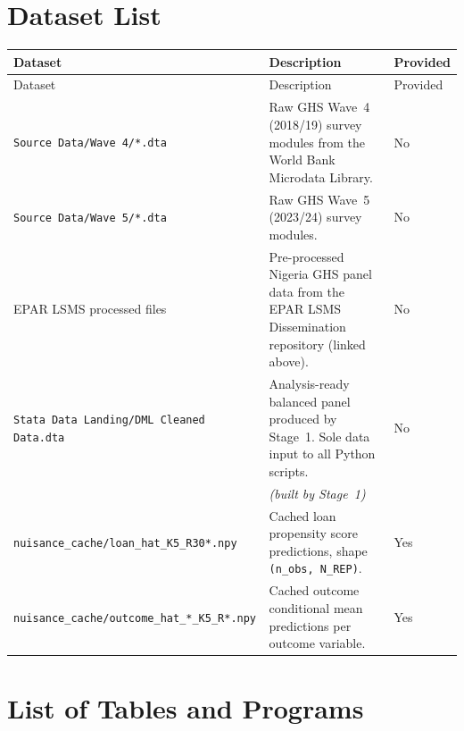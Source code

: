 \documentclass[11pt]{article}
\begin{document}
\section{Dataset List}

\begin{longtable}{@{}p{}p{}p{}@{}}
\toprule
Dataset & Description & Provided \\
\midrule
\endfirsthead
\toprule
Dataset & Description & Provided \\
\midrule
\endhead
\bottomrule
\endfoot
\texttt{Source Data/Wave 4/*.dta} &
    Raw GHS Wave~4 (2018/19) survey modules from the World Bank
    Microdata Library. &
    No \\[3pt]
\texttt{Source Data/Wave 5/*.dta} &
    Raw GHS Wave~5 (2023/24) survey modules. &
    No \\[3pt]
EPAR LSMS processed files &
    Pre-processed Nigeria GHS panel data from the EPAR LSMS
    Dissemination repository (linked above). &
    No \\[3pt]
\texttt{Stata Data Landing/\newline DML Cleaned Data.dta} &
    Analysis-ready balanced panel produced by Stage~1. Sole data
    input to all Python scripts. &
    No\\[-1pt]
    & \textit{(built by Stage~1)} & \\[3pt]
\texttt{nuisance\_cache/\newline loan\_hat\_K5\_R30*.npy} &
    Cached loan propensity score predictions,
    shape \texttt{(n\_obs, N\_REP)}. &
    Yes \\[3pt]
\texttt{nuisance\_cache/\newline outcome\_hat\_*\_K5\_R*.npy} &
    Cached outcome conditional mean predictions per outcome variable. &
    Yes \\
\end{longtable}

\section{List of Tables and Programs}
\end{document}
